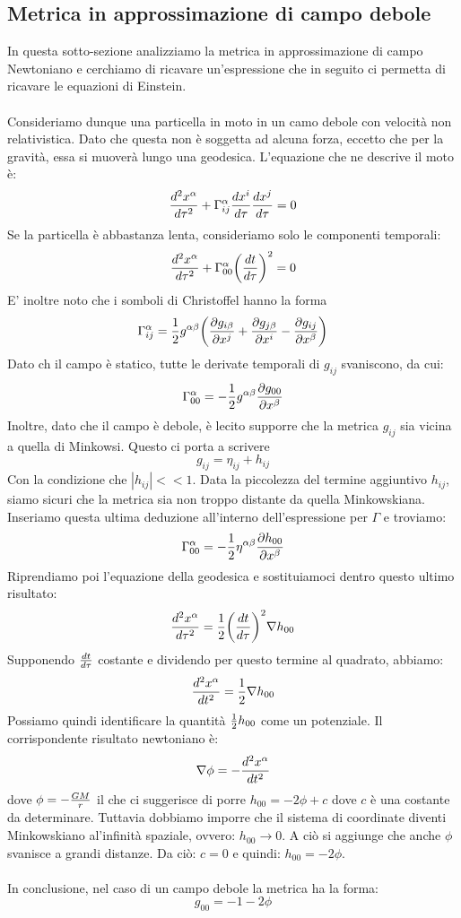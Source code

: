 \documentclass[]{report}
\theoremstyle{definition}
\theoremstyle{Theorem}
\theoremstyle{definition}
\theoremstyle{definition}
\theoremstyle{definition}
\begin{document}
\subsection{Metrica in approssimazione di campo debole}
In questa sotto-sezione analizziamo la metrica in approssimazione di campo Newtoniano e cerchiamo di ricavare un'espressione che in seguito ci permetta di ricavare le equazioni di Einstein.\\
\\
Consideriamo dunque una particella in moto in un camo debole con velocità non relativistica. Dato che questa non è soggetta ad alcuna forza, eccetto che per la gravità, essa si muoverà lungo una geodesica. L'equazione che ne descrive il moto è:
$${d^2x^\alpha\over d\tau^2}+\Gamma^\alpha_{ij}{dx^i\over d\tau}{dx^j\over d\tau}=0$$ 
Se la particella è abbastanza lenta, consideriamo solo le componenti temporali:
$${d^2x^\alpha\over d\tau^2}+\Gamma^\alpha_{00}\bigg{(}{dt\over d\tau}\bigg{)}^2=0$$
E' inoltre noto che i somboli di Christoffel hanno la forma
$$\Gamma_{ij}^\alpha={1\over 2}g^{\alpha\beta}\bigg{(}{\partial g_{i\beta}\over \partial x^j}+{\partial g_{j\beta}\over \partial x^i}-{\partial g_{ij}\over \partial x^\beta}\bigg{)}$$
Dato ch il campo è statico, tutte le derivate temporali di $g_{ij}$ svaniscono, da cui:
$$\Gamma^\alpha_{00}=-{1\over 2}g^{\alpha\beta}{\partial g_{00}\over \partial x^\beta}$$
Inoltre, dato che il campo è debole, è lecito supporre che la metrica $g_{ij}$ sia vicina a quella di Minkowsi. Questo ci porta a scrivere
$$g_{ij}=\eta_{ij}+h_{ij}$$
Con la condizione che $|h_{ij}|<<1$. Data la piccolezza del termine aggiuntivo $h_{ij}$, siamo sicuri che la metrica sia non troppo distante da quella Minkowskiana. Inseriamo questa ultima deduzione all'interno dell'espressione per $\Gamma$ e troviamo:
$$\Gamma^\alpha_{00}=-{1\over 2}\eta^{\alpha\beta}{\partial h_{00}\over \partial x^\beta}$$
Riprendiamo poi l'equazione della geodesica e sostituiamoci dentro questo ultimo risultato:
$${d^2x^\alpha\over d\tau^2}={1\over 2}\bigg{(}{dt\over d\tau}\bigg{)}^2\nabla h_{00}$$
Supponendo $dt\over d\tau$ costante e dividendo per questo termine al quadrato, abbiamo:
$${d^2x^\alpha\over dt^2}={1\over 2}\nabla h_{00}$$
Possiamo quindi identificare la quantità ${1\over 2}h_{00}$ come un potenziale. Il corrispondente risultato newtoniano è:
$$\nabla\phi=-{d^2x^\alpha\over dt^2}$$
dove $\phi=-{GM\over r}$
il che ci suggerisce di porre $h_{00}=-2\phi+c$ dove $c$ è una costante da determinare. Tuttavia dobbiamo imporre che il sistema di coordinate diventi Minkowskiano al'infinità spaziale, ovvero: $h_{00}\rightarrow 0$. A ciò si aggiunge che anche $\phi$ svanisce a grandi distanze. Da ciò: $c=0$ e quindi: $h_{00}=-2\phi$.\\
\\
In conclusione, nel caso di un campo debole la metrica ha la forma:
$$g_{00}=-1-2\phi$$
\end{document}
